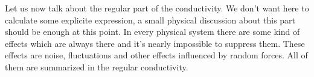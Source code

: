 Let us now talk about the regular part of the conductivity.
We don't want here to calculate some explicite expression, a small physical discussion about this part should be enough at this point.
In every physical system there are some kind of effects which are always there and it's nearly impossible to suppress them.
These effects are noise, fluctuations and other effects influenced by random forces.
All of them are summarized in the regular conductivity.






























